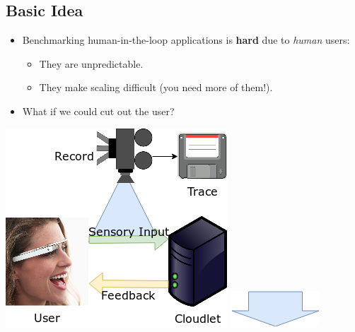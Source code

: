 \documentclass[portrait, a1]{KTHEEposter}
\begin{document}
\begin{pcolumns}[3]
\begin{pcolumn}[2]
\begin{pframe}[1.33]
                \section{Basic Idea}
                \begin{itemize}
                    \item Benchmarking human-in-the-loop applications is \textbf{hard} due to \emph{human} users:
                    \begin{itemize}
                        \item They are unpredictable.
                        \item They make scaling difficult (you need more of them!).
                    \end{itemize}
                    \item What if we could cut out the user?
                \end{itemize}
                \medskip
                \begin{center}
                    \medskip
                    \includegraphics[width=.8\linewidth]{img/trace_idea_1}
                    \medskip
                    \includegraphics{img/trace_idea_arrow}
                    \medskip

\end{center}
\end{pframe}
\end{pcolumn}
\end{pcolumns}
\end{document}
